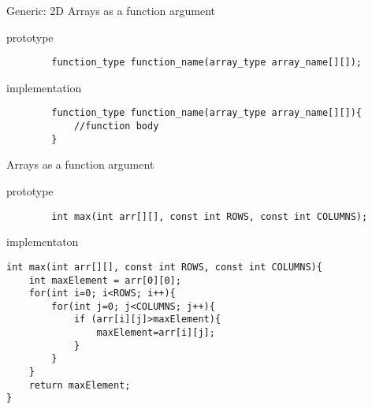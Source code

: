 \documentclass[xcolor={dvipsnames}]{beamer}
\begin{document}
\begin{frame}[fragile]{Generic: 2D Arrays as a function argument}
	\begin{block}{prototype}
	\begin{verbatim}
		function_type function_name(array_type array_name[][]);
	\end{verbatim}
	\end{block}
	\pause
	\begin{block}{implementation}
	\begin{verbatim}
		function_type function_name(array_type array_name[][]){
			//function body
		}
	\end{verbatim}
	\end{block}
\end{frame}

\begin{frame}[fragile]{Arrays as a function argument}
	\begin{block}{prototype}
	\begin{verbatim}
		int max(int arr[][], const int ROWS, const int COLUMNS);
	\end{verbatim}
	\end{block}
	\pause
	\begin{block}{implementaton}
	\begin{verbatim}
int max(int arr[][], const int ROWS, const int COLUMNS){
    int maxElement = arr[0][0];
    for(int i=0; i<ROWS; i++){
        for(int j=0; j<COLUMNS; j++){
            if (arr[i][j]>maxElement){
                maxElement=arr[i][j];
            }
        }
    }
    return maxElement;
}
	\end{verbatim}
	\end{block}
\end{frame}
\end{document}
